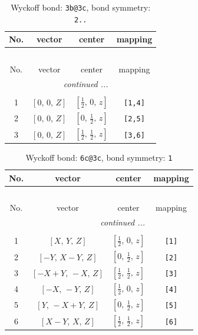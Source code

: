 \documentclass[fleqn,8pt]{jsarticle}
\begin{document}
\renewcommand{\arraystretch}{1.2}
\begin{longtable}{cccc}
\caption{Wyckoff bond: {\tt 3b@3c}, bond symmetry: {\tt 2..}}
 \\
 \hline \hline
No. & vector & center & mapping \\ \hline \endfirsthead

\multicolumn{3}{l}{\tablename\ \thetable{}} \\
 \hline \hline
No. & vector & center & mapping \\ \hline \endhead

 \hline \hline
\multicolumn{3}{r}{\footnotesize\it continued ...} \\ \endfoot

 \hline \hline
\multicolumn{3}{r}{} \\ \endlastfoot

1 & $\left[ 0,\, 0,\, Z \right]$ & $\left[ \frac{1}{2},\, 0,\, z \right]$ & {\tt [1,4]} \\ \hline
2 & $\left[ 0,\, 0,\, Z \right]$ & $\left[ 0,\, \frac{1}{2},\, z \right]$ & {\tt [2,5]} \\ \hline
3 & $\left[ 0,\, 0,\, Z \right]$ & $\left[ \frac{1}{2},\, \frac{1}{2},\, z \right]$ & {\tt [3,6]} \\
\end{longtable}
\renewcommand{\arraystretch}{1.2}
\begin{longtable}{cccc}
\caption{Wyckoff bond: {\tt 6c@3c}, bond symmetry: {\tt 1}}
 \\
 \hline \hline
No. & vector & center & mapping \\ \hline \endfirsthead

\multicolumn{3}{l}{\tablename\ \thetable{}} \\
 \hline \hline
No. & vector & center & mapping \\ \hline \endhead

 \hline \hline
\multicolumn{3}{r}{\footnotesize\it continued ...} \\ \endfoot

 \hline \hline
\multicolumn{3}{r}{} \\ \endlastfoot

1 & $\left[ X,\, Y,\, Z \right]$ & $\left[ \frac{1}{2},\, 0,\, z \right]$ & {\tt [1]} \\ \hline
2 & $\left[ - Y,\, X - Y,\, Z \right]$ & $\left[ 0,\, \frac{1}{2},\, z \right]$ & {\tt [2]} \\ \hline
3 & $\left[ - X + Y,\, - X,\, Z \right]$ & $\left[ \frac{1}{2},\, \frac{1}{2},\, z \right]$ & {\tt [3]} \\ \hline
4 & $\left[ - X,\, - Y,\, Z \right]$ & $\left[ \frac{1}{2},\, 0,\, z \right]$ & {\tt [4]} \\ \hline
5 & $\left[ Y,\, - X + Y,\, Z \right]$ & $\left[ 0,\, \frac{1}{2},\, z \right]$ & {\tt [5]} \\ \hline
6 & $\left[ X - Y,\, X,\, Z \right]$ & $\left[ \frac{1}{2},\, \frac{1}{2},\, z \right]$ & {\tt [6]} \\
\end{longtable}
\end{document}
